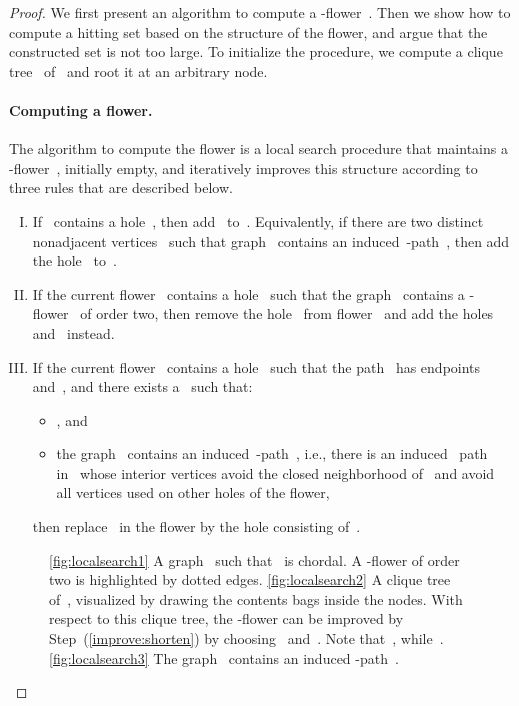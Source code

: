 \begin{lemma*}
\erdosposa
\end{lemma*}
\begin{proof}
We first present an algorithm to compute a -flower~. Then we show how to compute a hitting set based on the structure of the flower, and argue that the constructed set is not too large. To initialize the procedure, we compute a clique tree~ of~ and root it at an arbitrary node.

\paragraph{Computing a flower.} The algorithm to compute the flower is a local search procedure that maintains a -flower~, initially empty, and iteratively improves this structure according to three rules that are described below.

\begin{enumerate}[(I)]
	\item If~ contains a hole~, then add~ to~. Equivalently, if there are two distinct nonadjacent vertices~ such that graph~ contains an induced~-path~, then add the hole~ to~.\label{improve:addpath}
	\item If the current flower~ contains a hole~ such that the graph~ contains a -flower~ of order two, then remove the hole~ from flower~ and add the holes~ and~ instead.\label{improve:addtwoflower}
	\item If the current flower~ contains a hole~ such that the path~ has endpoints~ and~, and there exists a~ such that:
	\begin{itemize}
		\item , and
		\item the graph~ contains an induced~-path~, i.e., there is an induced~ path~ in~ whose interior vertices avoid the closed neighborhood of~ and avoid all vertices used on other holes of the flower,
	\end{itemize}
	then replace~ in the flower by the hole consisting of~.\label{improve:shorten}
\end{enumerate}

\begin{figure}[t]
\begin{center}
\caption{\ref{fig:localsearch1} A graph~ such that~ is chordal. A -flower of order two is highlighted by dotted edges. \ref{fig:localsearch2} A clique tree of~, visualized by drawing the contents bags inside the nodes. With respect to this clique tree, the -flower can be improved by Step~(\ref{improve:shorten}) by choosing~ and~. Note that~, while~. \ref{fig:localsearch3} The graph~ contains an induced -path~.} \label{fig:localsearch}
\end{center}
\end{figure}


\end{proof}
